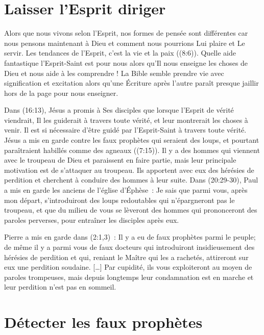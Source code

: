 \section*{Laisser l'Esprit diriger}

Alors que nous vivons selon l'Esprit, nos formes de pensée sont différentes
 car nous pensons maintenant à Dieu et comment nous pourrions
 Lui plaire et Le servir.
 Les tendances de l'Esprit, c'est la vie et la paix ((8:6)).
 Quelle aide fantastique l'Esprit-Saint est pour nous alors qu'Il nous enseigne
 les choses de Dieu et nous aide à les comprendre !
 La Bible semble prendre vie avec signification et excitation
 alors qu'une Écriture après l'autre paraît presque jaillir
 hors de la page pour nous enseigner.

Dans (16:13), Jésus a promis à Ses disciples
 que lorsque l'Esprit de vérité viendrait,
 Il les guiderait à travers toute vérité,
 et leur montrerait les choses à venir.
 Il est si nécessaire d'être guidé par l'Esprit-Saint
 à travers toute vérité.
 Jésus a mis en garde contre les faux prophètes qui seraient des loups,
 et pourtant paraîtraient habillés comme des agneaux ((7:15)).
 Il y a des hommes qui viennent avec le troupeau de Dieu
 et paraissent en faire partie, mais leur principale motivation
 est de s'attaquer au troupeau.
 Ils apportent avec eux des hérésies de perdition
 et cherchent à conduire des hommes à leur suite.
 Dans (20:29-30),
 Paul a mis en garde les anciens de l'église d'Éphèse~:
 \og Je sais que parmi vous, après mon départ,
 s'introduiront des loups redoutables
 qui n'épargneront pas le troupeau,
 et que du milieu de vous se lèveront des hommes
 qui prononceront des paroles perverses,
 pour entraîner les disciples après eux. \fg{}

Pierre a mis en garde dans (2:1,3)~:
 \og Il y a eu de faux prophètes parmi le peuple;
 de même il y a parmi vous de faux docteurs
 qui introduiront insidieusement des hérésies de perdition et qui,
 reniant le Maître qui les a rachetés,
 attireront sur eux une perdition soudaine. [\dots{}]
 Par cupidité, ils vous exploiteront au moyen de paroles trompeuses,
 mais depuis longtemps leur condamnation est en marche
 et leur perdition n'est pas en sommeil. \fg{}


\section*{Détecter les faux prophètes}

